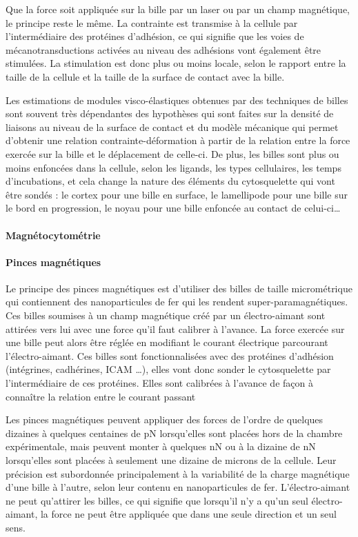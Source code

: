 \documentclass{report}
\begin{document}
Que la force soit appliquée sur la bille par un laser ou par un champ magnétique, le principe reste le même. La contrainte est transmise à la cellule par l'intermédiaire des protéines d'adhésion, ce qui signifie que les voies de mécanotransductions activées au niveau des adhésions vont également être stimulées. 
La stimulation est donc plus ou moins locale, selon le rapport entre la taille de la cellule et la taille de la surface de contact avec la bille.

Les estimations de modules visco-élastiques obtenues par des techniques de billes sont souvent très dépendantes des hypothèses qui sont faites sur la densité de liaisons au niveau de la surface de contact et du modèle mécanique qui permet d'obtenir une relation contrainte-déformation à partir de la relation entre la force exercée sur la bille et le déplacement de celle-ci. 
De plus, les billes sont plus ou moins enfoncées dans la cellule, selon les ligands, les types cellulaires, les temps d'incubations, et cela change la nature des éléments du cytosquelette qui vont être sondés : le cortex pour une bille en surface, le lamellipode pour une bille sur le bord en progression, le noyau pour une bille enfoncée au contact de celui-ci\dots


\paragraph{Magnétocytométrie}
\paragraph{Pinces magnétiques}

Le principe des pinces magnétiques est d'utiliser des billes de taille micrométrique qui contiennent des nanoparticules de fer qui les rendent super-paramagnétiques.
Ces billes soumises à un champ magnétique créé par un électro-aimant sont attirées vers lui avec une force qu'il faut calibrer à l'avance.
La force exercée sur une bille peut alors être réglée en modifiant le courant électrique parcourant l'électro-aimant.
Ces billes sont fonctionnalisées avec des protéines d'adhésion (intégrines, cadhérines, ICAM \dots), elles vont donc sonder le cytosquelette par l'intermédiaire de ces protéines. 
Elles sont calibrées à l'avance de façon à connaître la relation entre le courant passant

Les pinces magnétiques peuvent appliquer des forces de l'ordre de quelques dizaines à quelques centaines de pN lorsqu'elles sont placées hors de la chambre expérimentale, mais peuvent monter à quelques nN ou à la dizaine de nN lorsqu'elles sont placées à seulement une dizaine de microns de la cellule. 
Leur précision est subordonnée principalement à la variabilité de la charge magnétique d'une bille à l'autre, selon leur contenu en nanoparticules de fer. 
L'électro-aimant ne peut qu'attirer les billes, ce qui signifie que lorsqu'il n'y a qu'un seul électro-aimant, la force ne peut être appliquée que dans une seule direction et un seul sens. 
\end{document}
